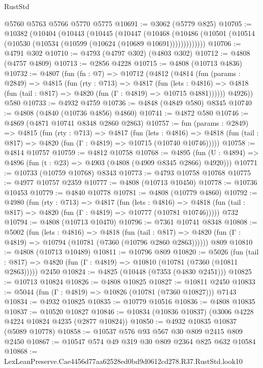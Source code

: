 \begin{lexlean}{RustStd}
\begin{coremodule}
    @5760
    @5763
    @5766
    @5770
    @5775
@10691 := @3062 (@5779 @825)
@10705 := @10382
    (@10404
      (@10443
        (@10445
          (@10447
            (@10468
              (@10486 (@10501 (@10514 (@10530 (@10534 (@10599 (@10624 (@10689 @10691)))))))))))))
@10706 := @4791 @302
@10710 := @4793 (@4797 @302) (@4803 @302)
@10712 := @4808 (@4757 @4809)
@10713 := @2856 @4228
@10715 := @4808 (@10713 @4836)
@10732 := @4807
    (fun (fn : @7) =>
    @10712
      (@4812
        (@4814
          (fun (params : @2849) =>
          @4815
            (fun (rty : @713) =>
            @4817
              (fun (lets : @4816) =>
              @4818 (fun (tail : @817) => @4820 (fun (Γ : @4819) => @10715 @4881))))))
        @4926))
    @580
@10733 := @4932 @4759
@10736 := @4848 (@4849 @580) @8345
@10740 := @4808 (@4840 (@10736 @4856) @4860)
@10741 := @4872 @580
@10746 := @4869 (@4871 @10741 @8348 @2860 @2863)
@10757 := fun (params : @2849) =>
  @4815
    (fun (rty : @713) =>
    @4817
      (fun (lets : @4816) =>
      @4818 (fun (tail : @817) => @4820 (fun (Γ : @4819) => @10715 (@10740 @10746)))))
@10758 := @4814 @10757
@10759 := @4812 @10758
@10768 := @4895
    (fun (U : @4894) => @4896 (fun (t : @23) => @4903 (@4808 (@4909 @8345 @2866) @4920)))
@10771 := @10733 (@10759 @10768) @8343
@10773 := @4793 @10758 @10768
@10775 := @4977 @10757 @2359
@10777 := @4808 (@10713 @10450)
@10778 := @10736 @10453
@10779 := @4840 @10778
@10781 := @4808 (@10779 @4860)
@10792 := @4980
    (fun (rty : @713) =>
    @4817
      (fun (lets : @4816) =>
      @4818 (fun (tail : @817) => @4820 (fun (Γ : @4819) => @10777 (@10781 @10746)))))
    @732
@10794 := @4808 (@10713 @10470)
@10796 := @7361 @10741 @8348
@10808 := @5002
    (fun (lets : @4816) =>
    @4818
      (fun (tail : @817) =>
      @4820 (fun (Γ : @4819) => @10794 (@10781 (@7360 (@10796 @2860 @2863))))))
    @809
@10810 := @4808 (@10713 @10489)
@10811 := @10796 @809
@10820 := @5026
    (fun (tail : @817) => @4820 (fun (Γ : @4819) => @10810 (@10781 (@7360 (@10811 @2863)))))
    @2450
@10824 := @4825 (@10448 (@7353 (@4830 @2451)))
@10825 := @10713 @10824
@10826 := @4808 @10825
@10827 := @10811 @2450
@10833 := @5044 (fun (Γ : @4819) => @10826 (@10781 (@7360 @10827))) @7143
@10834 := @4932 @10825
@10835 := @10779 @10516
@10836 := @4808 @10835
@10837 := @10520 @10827
@10846 := @10834 (@10836 @10837) (@3006 @4228 @4224 @10824 @4235 (@2877 @10824))
@10850 := @4932 @10835 @10837 (@5089 @10778)
@10858 := @10537 @576 @93 @567 @30 @809 @2415 @809 @2450
@10867 := @10547 @574 @49 @319 @30 @809 @2364 @825 @632 @10584
@10868 := LexLeanPreserve.Cae4456d77aa62528ed0bd9d0612cd278.R37.RustStd.look10

\end{coremodule}
\end{lexlean}
